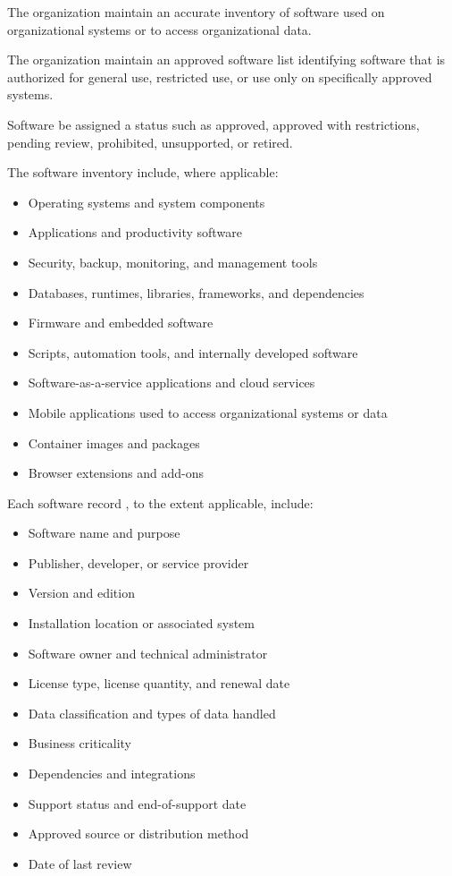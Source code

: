 The organization \must{} maintain an accurate inventory of software used on organizational systems or to access organizational data.

The organization \should{} maintain an approved software list identifying software that is authorized for general use, restricted use, or use only on specifically approved systems.

Software \should{} be assigned a status such as approved, approved with restrictions, pending review, prohibited, unsupported, or retired.

The software inventory \must{} include, where applicable:
\begin{itemize}
    \item Operating systems and system components
    \item Applications and productivity software
    \item Security, backup, monitoring, and management tools
    \item Databases, runtimes, libraries, frameworks, and dependencies
    \item Firmware and embedded software
    \item Scripts, automation tools, and internally developed software
    \item Software-as-a-service applications and cloud services
    \item Mobile applications used to access organizational systems or data
    \item Container images and packages
    \item Browser extensions and add-ons
\end{itemize}

Each software record \must{}, to the extent applicable, include:
\begin{itemize}
    \item Software name and purpose
    \item Publisher, developer, or service provider
    \item Version and edition
    \item Installation location or associated system
    \item Software owner and technical administrator
    \item License type, license quantity, and renewal date
    \item Data classification and types of data handled
    \item Business criticality
    \item Dependencies and integrations
    \item Support status and end-of-support date
    \item Approved source or distribution method
    \item Date of last review
\end{itemize}

